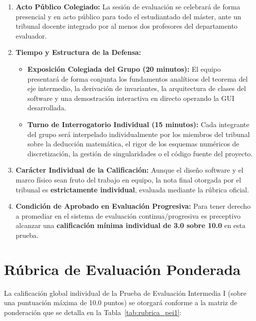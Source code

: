 \documentclass[11pt, a4paper]{article}
\begin{document}
\begin{enumerate}[leftmargin=*]
    \item \textbf{Acto Público Colegiado:} La sesión de evaluación se celebrará de forma presencial y en acto público para todo el estudiantado del máster, ante un tribunal docente integrado por al menos dos profesores del departamento evaluador.
    \item \textbf{Tiempo y Estructura de la Defensa:}
    \begin{itemize}
        \item \textbf{Exposición Colegiada del Grupo (20 minutos):} El equipo presentará de forma conjunta los fundamentos analíticos del teorema del eje intermedio, la derivación de invariantes, la arquitectura de clases del software y una demostración interactiva en directo operando la GUI desarrollada.
        \item \textbf{Turno de Interrogatorio Individual (15 minutos):} Cada integrante del grupo será interpelado individualmente por los miembros del tribunal sobre la deducción matemática, el rigor de los esquemas numéricos de discretización, la gestión de singularidades o el código fuente del proyecto.
    \end{itemize}
    \item \textbf{Carácter Individual de la Calificación:} Aunque el diseño software y el marco físico sean fruto del trabajo en equipo, la nota final otorgada por el tribunal es \textbf{estrictamente individual}, evaluada mediante la rúbrica oficial.
    \item \textbf{Condición de Aprobado en Evaluación Progresiva:} Para tener derecho a promediar en el sistema de evaluación continua/progresiva es preceptivo alcanzar una \textbf{calificación mínima individual de 3.0 sobre 10.0} en esta prueba.
\end{enumerate}

\newpage
\section{Rúbrica de Evaluación Ponderada}

La calificación global individual de la Prueba de Evaluación Intermedia I (sobre una puntuación máxima de 10.0 puntos) se otorgará conforme a la matriz de ponderación que se detalla en la Tabla~\ref{tab:rubrica_pei1}:
\end{document}
